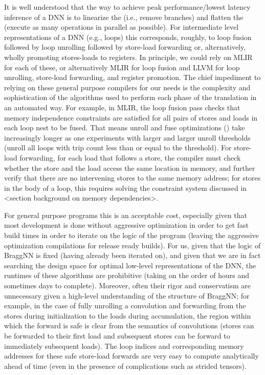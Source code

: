 It is well understood that the way to achieve peak performance/lowest latency inference of a DNN is to linearize the  (i.e., remove branches) and flatten the  (execute as many operations in parallel as possible).
For intermediate level representations of a DNN (e.g., loops) this corresponds, roughly, to loop fusion followed by loop unrolling followed by store-load forwarding or, alternatively, wholly promoting stores-loads to registers.
In principle, we could rely on MLIR for each of these, or alternatively MLIR for loop fusion and LLVM for loop unrolling, store-load forwarding, and register promotion.
The chief impediment to relying on these general purpose compilers for our needs is the complexity and sophistication of the algorithms used to perform each phase of the translation in an automated way.
For example, in MLIR, the loop fusion pass checks that memory independence constraints are satisfied for all pairs of stores and loads in each loop nest to be fused.
That means unroll and fuse optimizations () take increasingly longer as one experiments with larger and larger unroll thresholds (unroll all loops with trip count less than or equal to the threshold).
For store-load forwarding, for each load that follows a store, the compiler must check whether the store and the load access the same location in memory, and further verify that there are no intervening stores to the same memory address; for stores in the body of a loop, this requires solving the constraint system discussed in <section background on memory dependencies>.

For general purpose programs this is an acceptable cost, especially given that most development is done without aggressive optimization in order to get fast build times in order to iterate on the logic of the program (leaving the aggressive optimization compilations for release ready builds).
For us, given that the logic of BraggNN is fixed (having already been iterated on), and given that we are in fact searching the design space for optimal low-level representations of the DNN, the runtimes of these algorithms are prohibitive (taking on the order of hours and sometimes days to complete).
Moreover, often their rigor and conservatism are unnecessary given a high-level understanding of the structure of BraggNN; for example, in the case of fully unrolling a convolution and forwarding from the stores during initialization to the loads during accumulation, the region within which the forward is safe is clear from the semantics of convolutions (stores can be forwarded to their first load and subsequent stores can be forward to immediately subsequent loads).
The loop indices and corresponding memory addresses for these safe store-load forwards are very easy to compute analytically ahead of time (even in the presence of complications such as strided tensors).

